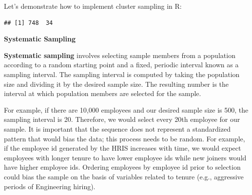 \documentclass[]{book}
\newenvironment{Shaded}{\begin{snugshade}}{\end{snugshade}}
\newcommand{\CommentTok}[1]{\textcolor[rgb]{0.56,0.35,0.01}{\textit{#1}}}
\newcommand{\DataTypeTok}[1]{\textcolor[rgb]{0.13,0.29,0.53}{#1}}
\newcommand{\DecValTok}[1]{\textcolor[rgb]{0.00,0.00,0.81}{#1}}
\newcommand{\KeywordTok}[1]{\textcolor[rgb]{0.13,0.29,0.53}{\textbf{#1}}}
\newcommand{\NormalTok}[1]{#1}
\newcommand{\OperatorTok}[1]{\textcolor[rgb]{0.81,0.36,0.00}{\textbf{#1}}}
\newcommand{\StringTok}[1]{\textcolor[rgb]{0.31,0.60,0.02}{#1}}
\begin{document}
Let's demonstrate how to implement cluster sampling in R:

\begin{Shaded}
\end{Shaded}

\begin{verbatim}
## [1] 748  34
\end{verbatim}

\textbf{Systematic Sampling}

\textbf{Systematic sampling} involves selecting sample members from a population according to a random starting point and a fixed, periodic interval known as a sampling interval. The sampling interval is computed by taking the population size and dividing it by the desired sample size. The resulting number is the interval at which population members are selected for the sample.

For example, if there are 10,000 employees and our desired sample size is 500, the sampling interval is 20. Therefore, we would select every 20th employee for our sample. It is important that the sequence does not represent a standardized pattern that would bias the data; this process needs to be random. For example, if the employee id generated by the HRIS increases with time, we would expect employees with longer tenure to have lower employee ids while new joiners would have higher employee ids. Ordering employees by employee id prior to selection could bias the sample on the basis of variables related to tenure (e.g., aggressive periods of Engineering hiring).
\end{document}
